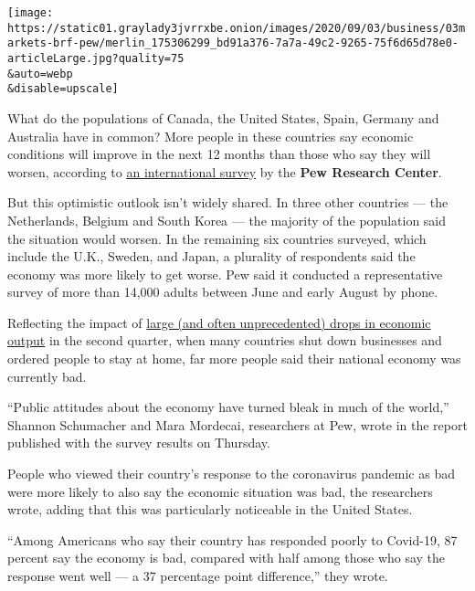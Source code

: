 \texttt{[image: https://static01.graylady3jvrrxbe.onion/images/2020/09/03/business/03markets-brf-pew/merlin\_175306299\_bd91a376-7a7a-49c2-9265-75f6d65d78e0-articleLarge.jpg?quality=75\\\&auto=webp\\\&disable=upscale]}

What do the populations of Canada, the United States, Spain, Germany and
Australia have in common? More people in these countries say economic
conditions will improve in the next 12 months than those who say they
will worsen, according to
\href{https://www.pewresearch.org/fact-tank/2020/09/03/views-of-the-economy-have-turned-sharply-negative-in-many-countries-amid-covid-19/}{an
international survey} by the \textbf{Pew Research Center}.

But this optimistic outlook isn't widely shared. In three other
countries --- the Netherlands, Belgium and South Korea --- the majority
of the population said the situation would worsen. In the remaining six
countries surveyed, which include the U.K., Sweden, and Japan, a
plurality of respondents said the economy was more likely to get worse.
Pew said it conducted a representative survey of more than 14,000 adults
between June and early August by phone.

Reflecting the impact of
\href{https://www.oecd.org/sdd/na/gdp-growth-second-quarter-2020-oecd.htm\#:~:text=Unprecedented\%20fall\%20in\%20OECD\%20GDP\%20by\%209.8\%25\%20in\%20Q2\%202020\&text=Among\%20the\%20Major\%20Seven\%20economies,\%25\%2C\%20in\%20the\%20United\%20Kingdom.\&text=Year\%2Don\%2Dyear\%20GDP\%20growth,0.9\%25\%20in\%20the\%20previous\%20quarter.}{large
(and often unprecedented) drops in economic output} in the second
quarter, when many countries shut down businesses and ordered people to
stay at home, far more people said their national economy was currently
bad.

``Public attitudes about the economy have turned bleak in much of the
world,'' Shannon Schumacher and Mara Mordecai, researchers at Pew, wrote
in the report published with the survey results on Thursday.

People who viewed their country's response to the coronavirus pandemic
as bad were more likely to also say the economic situation was bad, the
researchers wrote, adding that this was particularly noticeable in the
United States.

``Among Americans who say their country has responded poorly to
Covid-19, 87 percent say the economy is bad, compared with half among
those who say the response went well --- a 37 percentage point
difference,'' they wrote.

